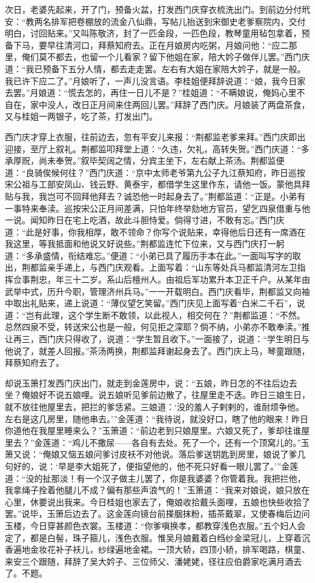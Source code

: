 次日，老婆先起来，开了门，预备火盆，打发西门庆穿衣梳洗出门。到前边分付玳安：“教两名排军把卷棚放的流金八仙鼎，写帖儿抬送到宋御史老爹察院内，交付明白，讨回贴来。”又叫陈敬济，封了一匹金段，一匹色段，教琴童用毡包拿着，预备下马，要早往清河口，拜蔡知府去。正在月娘房内吃粥，月娘问他：“应二那里，俺们莫不都去，也留一个儿看家？留下他姐在家，陪大妗子做伴儿罢。”西门庆道：“我已预备下五分人情，都去走走罢。左右有大姐在家陪大妗子，就是一般。我已许下应二了。”月娘听了，一声儿没言语。李桂姐便拜辞说道：“娘，我今日家去罢。”月娘道：“慌去怎的，再住一日儿不是？”桂姐道：“不瞒娘说，俺妈心里不自在，家中没人，改日正月间来住两回儿罢。”拜辞了西门庆。月娘装了两盘茶食，又与桂姐一两银子，吃了茶，打发出门。

西门庆才穿上衣服，往前边去，忽有平安儿来报：“荆都监老爹来拜。”西门庆即出迎接，至厅上叙礼。荆都监叩拜堂上道：“久违，欠礼，高转失贺。”西门庆道：“多承厚贶，尚未奉贺。”叙毕契阔之情，分宾主坐下，左右献上茶汤。荆都监便道：“良骑俟候何往？”西门庆道：“京中太师老爷第九公子九江蔡知府，昨日巡按宋公祖与工部安凤山、钱云野、黄泰宇，都借学生这里作东，请他一饭。蒙他具拜贴与我，我岂可不回拜他拜去？诚恐他一时起身去了。”荆都监道：“正是。小弟有一事特来奉渎。巡按宋公正月间差满，只怕年终举劾地方官员，望乞四泉借重与他一说。闻知昨日在宅上吃酒，故此斗胆恃爱。倘得寸进，不敢有忘。”西门庆道：“此是好事，你我相厚，敢不领命？你写个说贴来，幸得他后日还有一席酒在我这里，等我抵面和他说又好说些。”荆都监连忙下位来，又与西门庆打一躬道：“多承盛情，衔结难忘。”便道：“小弟已具了履历手本在此。”一面叫写字的取出，荆都监亲手递上，与西门庆观看。上面写着：“山东等处兵马都监清河左卫指挥佥事荆忠，年三十二岁。系山后檀州人。由祖后军功累升本卫正千户。从某年由武举中式，历升今职，管理济州兵马。”一一开载明白。西门庆看毕，荆都监又向袖中取出礼贴来，递上说道：“薄仪望乞笑留。”西门庆见上面写着“白米二千石”，说道：“岂有此理，这个学生断不敢领，以此视人，相交何在？”荆都监道：“不然。总然四泉不受，转送宋公也是一般，何见拒之深耶？倘不纳，小弟亦不敢奉渎。”推让再三，西门庆只得收了，说道：“学生暂且收下。”一面接了，说道：“学生明日与他说了，就差人回报。”茶汤两换，荆都监拜谢起身去了。西门庆上马，琴童跟随，拜蔡知府去了。

却说玉箫打发西门庆出门，就走到金莲房中，说：“五娘，昨日怎的不往后边去坐？俺娘好不说五娘哩。说五娘听见爹前边散了，往屋里走不迭。昨日三娘生日，就不放往他屋里去，把拦的爹恁紧。三娘道：‘没的羞人子剌剌的，谁耐烦争他。左右是这几房里，随他串去。’”金莲道：“我待说，就没好口，瞎了他的眼来！昨日你道他在我屋里睡来么？”玉箫道：“前边老到只娘屋里。六娘又死了，爹却往谁屋里去？”金莲道：“鸡儿不撒尿——各自有去处。死了一个，还有一个顶窝儿的。”玉箫又说：“俺娘又恼五娘问爹讨皮袄不对他说。落后爹送钥匙到房里，娘说了爹几句好的，说：‘早是李大姐死了，便指望他的，他不死只好看一眼儿罢了。’”金莲道：“没的扯那\textMaoBi 淡！有一个汉子做主儿罢了，你是我婆婆？你管着我。我把拦他，我拿绳子拴着他腿儿不成？偏有那些\textMaoBi 声浪气的！”玉箫道：“我来对娘说，娘只放在心里，休要说出我来。今日桂姐也家去了，俺娘收拾戴头面哩，五娘也快些收拾了罢。”说毕，玉箫后边去了。这金莲向镜台前搽胭抹粉，插茶戴翠，又使春梅后边问玉楼，今日穿甚颜色衣裳。玉楼道：“你爹嗔换孝，都教穿浅色衣服。”五个妇人会定了，都是白髻，珠子箍儿，浅色衣服。惟吴月娘戴着白绉纱金梁冠儿，上穿着沉香遍地金妆花补子袄儿，纱绿遍地金裙。一顶大轿，四顶小轿，排军喝路，棋童、来安三个跟随，拜辞了吴大妗子、三位师父、潘姥姥，径往应伯爵家吃满月酒去了。不题。

